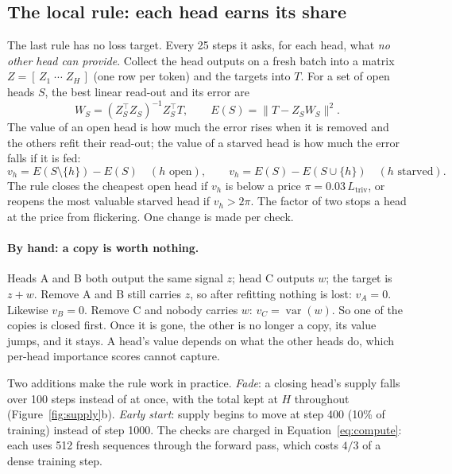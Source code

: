 \documentclass[11pt]{report}
\newcommand{\Ltriv}{L_{\mathrm{triv}}}
\begin{document}
\subsection{The local rule: each head earns its share}
\label{sec:local}

The last rule has no loss target. Every 25 steps it asks, for each head, what \emph{no
other head can provide}. Collect the head outputs on a fresh batch into a matrix
$Z = [\,Z_1\;\cdots\;Z_H\,]$ (one row per token) and the targets into $T$. For a set of
open heads $S$, the best linear read-out and its error are
\begin{equation}
  W_S = (Z_S^\top Z_S)^{-1} Z_S^\top T, \qquad
  E(S) = \lVert T - Z_S W_S \rVert^2 .
\end{equation}
The value of an open head is how much the error rises when it is removed and the others
refit their read-out; the value of a starved head is how much the error falls if it is
fed:
\begin{equation}
  v_h = E(S \setminus \{h\}) - E(S) \quad (h \text{ open}), \qquad
  v_h = E(S) - E(S \cup \{h\}) \quad (h \text{ starved}).
\end{equation}
The rule closes the cheapest open head if $v_h$ is below a price $\pi = 0.03\,\Ltriv$, or
reopens the most valuable starved head if $v_h > 2\pi$. The factor of two stops a head at
the price from flickering. One change is made per check.

\paragraph{By hand: a copy is worth nothing.} Heads A and B both output the same signal
$z$; head C outputs $w$; the target is $z + w$. Remove A and B still carries $z$, so after
refitting nothing is lost: $v_A = 0$. Likewise $v_B = 0$. Remove C and nobody carries $w$:
$v_C = \operatorname{var}(w)$. So one of the copies is closed first. Once it is gone, the
other is no longer a copy, its value jumps, and it stays. A head's value depends on what
the other heads do, which per-head importance scores cannot capture.

Two additions make the rule work in practice. \emph{Fade}: a closing head's supply falls
over 100 steps instead of at once, with the total kept at $H$ throughout
(Figure~\ref{fig:supply}b). \emph{Early start}: supply begins to move at step 400 (10\%
of training) instead of step 1000. The checks are charged in Equation~\eqref{eq:compute}:
each uses 512 fresh sequences through the forward pass, which costs $4/3$ of a dense
training step.
\end{document}
